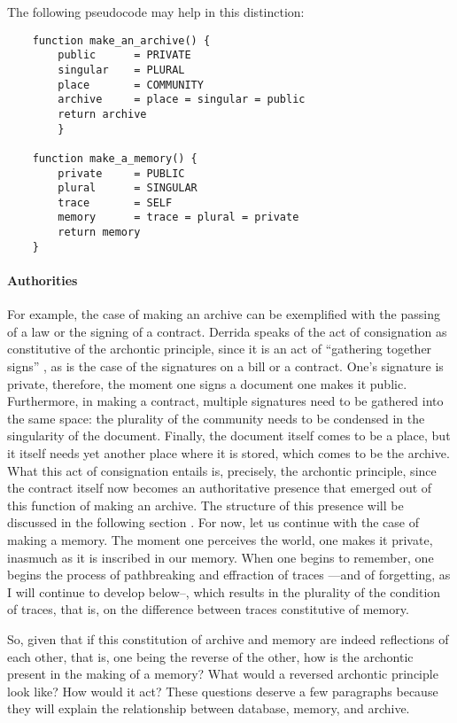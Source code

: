 	The following pseudocode may help in this distinction:

	\begin{flushleft}
	\small
	\begin{lstlisting}
	function make_an_archive() {
		public 	 	= PRIVATE
		singular 	= PLURAL
		place 	 	= COMMUNITY
		archive  	= place = singular = public
		return archive
		}

	function make_a_memory() {
		private 	= PUBLIC
		plural 		= SINGULAR
		trace 		= SELF
		memory 		= trace = plural = private 
		return memory
	}
	\end{lstlisting}
	\end{flushleft}

	\paragraph{Authorities}
	For example, the case of making an archive can be exemplified with the passing of a law or the signing of a contract. Derrida speaks of the act of consignation as constitutive of the archontic principle, since it is an act of ``gathering together signs'' \parencite[10]{Der95:Arc}, as is the case of the signatures on a bill or a contract. One's signature is private, therefore, the moment one signs a document one makes it public. Furthermore, in making a contract, multiple signatures need to be gathered into the same space: the plurality of the community needs to be condensed in the singularity of the document. Finally, the document itself comes to be a place, but it itself needs yet another place where it is stored, which comes to be the archive. What this act of consignation entails is, precisely, the archontic principle, since the contract itself now becomes an authoritative presence that emerged out of this function of making an archive. The structure of this presence will be discussed in the following section . For now, let us continue with the case of making a memory. The moment one perceives the world, one makes it private, inasmuch as it is inscribed in our memory. When one begins to remember, one begins the process of pathbreaking and effraction of traces ---and of forgetting, as I will continue to develop below--, which results in the plurality of the condition of traces, that is, on the difference between traces constitutive of memory.

	So, given that if this constitution of archive and memory are indeed reflections of each other, that is, one being the reverse of the other, how is the archontic present in the making of a memory? What would a reversed archontic principle look like? How would it act? These questions deserve a few paragraphs because they will explain the relationship between database, memory, and archive. 

